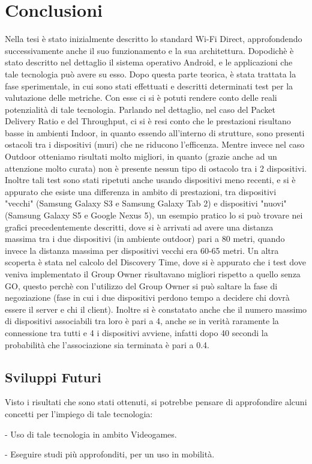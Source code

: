\chapter{Conclusioni}
Nella tesi è stato inizialmente descritto lo standard Wi-Fi Direct, approfondendo successivamente anche il suo funzionamento e la sua architettura.
Dopodichè è stato descritto nel dettaglio il sistema operativo Android, e le applicazioni che tale tecnologia può avere su esso.
Dopo questa parte teorica, è stata trattata la fase sperimentale, in cui sono stati effettuati e descritti determinati test per la valutazione delle metriche.
Con esse ci si è potuti rendere conto delle reali potenzialità di tale tecnologia.
Parlando nel dettaglio, nel caso del Packet Delivery Ratio e del Throughput, ci si è resi conto che le prestazioni risultano basse in ambienti Indoor, in quanto essendo all'interno di strutture, sono presenti ostacoli tra i dispositivi (muri) che ne riducono l'efficenza.
Mentre invece nel caso Outdoor otteniamo risultati molto migliori, in quanto (grazie anche ad un attenzione molto curata) non è presente nessun tipo di ostacolo tra i 2 dispositivi.
Inoltre tali test sono stati ripetuti anche usando dispositivi meno recenti, e si è appurato che esiste una differenza in ambito di prestazioni, tra dispositivi "vecchi" (Samsung Galaxy S3 e Samsung Galaxy Tab 2) e dispositivi "nuovi" (Samsung Galaxy S5 e Google Nexus 5), un esempio pratico lo si può trovare nei grafici precedentemente descritti, dove si è arrivati ad avere una distanza massima tra i due dispositivi (in ambiente outdoor) pari a 80 metri, quando invece la distanza massima per dispositivi vecchi era 60-65 metri.
Un altra scoperta è stata nel calcolo del Discovery Time, dove si è appurato che i test dove veniva implementato il Group Owner risultavano migliori rispetto a quello senza GO, questo perchè con l'utilizzo del Group Owner si può saltare la fase di negoziazione (fase in cui i due dispositivi perdono tempo a decidere chi dovrà essere il server e chi il client).
Inoltre si è constatato anche che il numero massimo di dispositivi associabili tra loro è pari a 4, anche se in verità raramente la connessione tra tutti e 4 i dispositivi avviene, infatti dopo 40 secondi la probabilità che l'associazione sia terminata è pari a 0.4.

\section{Sviluppi Futuri}

Visto i risultati che sono stati ottenuti, si potrebbe pensare di approfondire alcuni concetti per l'impiego di tale tecnologia:

- Uso di tale tecnologia in ambito Videogames.

- Eseguire studi più approfonditi, per un uso in mobilità.

\clearpage{\pagestyle{empty}\cleardoublepage}